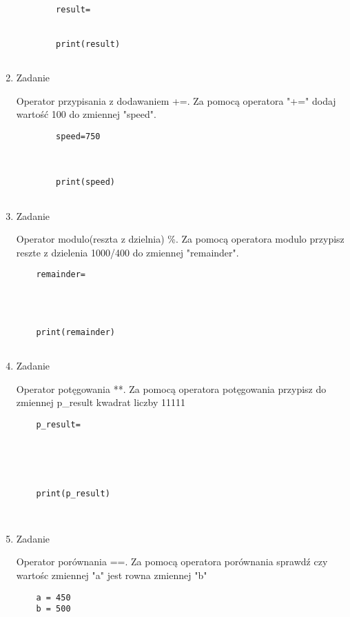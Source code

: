 \documentclass[11pt]{article}
\begin{document}
\begin{enumerate}
\begin{lstlisting}
		
		result=
		
		
		print(result)
		
	\end{lstlisting}

	\item 
	\begin{Large}
		Zadanie
	\end{Large}
	\par
	Operator przypisania z dodawaniem +=. Za pomocą operatora "+=" dodaj wartość 100 do zmiennej "speed".
	\begin{lstlisting}
		speed=750
			
		
		
		print(speed)
		
	\end{lstlisting}

	\item 
\begin{Large}
	Zadanie
\end{Large}
\par
Operator modulo(reszta z dzielnia) \%. Za pomocą operatora modulo przypisz reszte z dzielenia 1000/400 do zmiennej "remainder".
\begin{lstlisting}
	remainder=
	
	
	
	
	print(remainder)
	
\end{lstlisting}

	\item 
\begin{Large}
	Zadanie
\end{Large}
\par
Operator potęgowania **. Za pomocą operatora potęgowania przypisz do zmiennej p\_result kwadrat liczby 11111
\begin{lstlisting}
	p_result=
	
	
	
	
	
	print(p_result)
	
	
\end{lstlisting}

	\item 
\begin{Large}
	Zadanie
\end{Large}
\par
Operator porównania ==. Za pomocą operatora porównania sprawdź czy wartośc zmiennej "a" jest rowna zmiennej "b"
\begin{lstlisting}
	a = 450
	b = 500
	

\end{lstlisting}
\end{enumerate}
\end{document}
